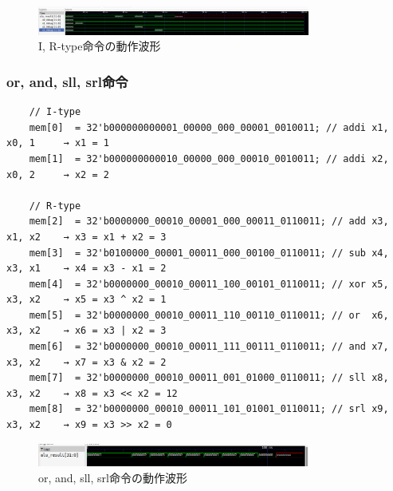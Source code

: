 \documentclass[a4paper, 11pt]{article}
\begin{document}
\begin{figure}[h]
\centering
\includegraphics[width=0.8\textwidth]{images/add.png}
\caption{I, R-type命令の動作波形}
\label{fig:addwave}
\end{figure}

\subsubsection{or, and, sll, srl命令}
\begin{lstlisting}
    // I-type
    mem[0]  = 32'b000000000001_00000_000_00001_0010011; // addi x1, x0, 1     → x1 = 1
    mem[1]  = 32'b000000000010_00000_000_00010_0010011; // addi x2, x0, 2     → x2 = 2

    // R-type
    mem[2]  = 32'b0000000_00010_00001_000_00011_0110011; // add x3, x1, x2    → x3 = x1 + x2 = 3
    mem[3]  = 32'b0100000_00001_00011_000_00100_0110011; // sub x4, x3, x1    → x4 = x3 - x1 = 2
    mem[4]  = 32'b0000000_00010_00011_100_00101_0110011; // xor x5, x3, x2    → x5 = x3 ^ x2 = 1
    mem[5]  = 32'b0000000_00010_00011_110_00110_0110011; // or  x6, x3, x2    → x6 = x3 | x2 = 3
    mem[6]  = 32'b0000000_00010_00011_111_00111_0110011; // and x7, x3, x2    → x7 = x3 & x2 = 2
    mem[7]  = 32'b0000000_00010_00011_001_01000_0110011; // sll x8, x3, x2    → x8 = x3 << x2 = 12
    mem[8]  = 32'b0000000_00010_00011_101_01001_0110011; // srl x9, x3, x2    → x9 = x3 >> x2 = 0
\end{lstlisting}

\begin{figure}[h]
\centering
\includegraphics[width=0.8\textwidth]{images/load.png}
\caption{or, and, sll, srl命令の動作波形}
\label{fig:addwave}
\end{figure}
\end{document}
